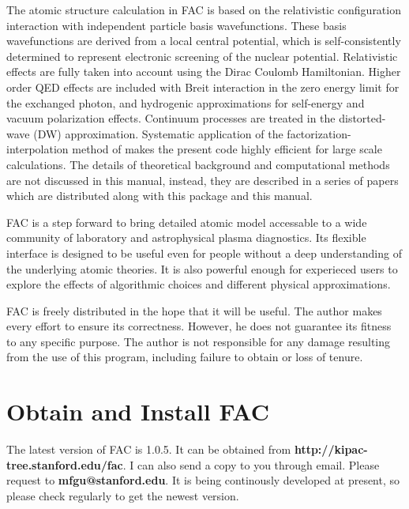 \documentclass[twoside,letterpaper]{refrep}
\newcommand{\facversion}{{1.0.5}\xspace}
\begin{document}
The atomic structure calculation in FAC is based on the relativistic
configuration interaction with independent particle basis wavefunctions. These
basis wavefunctions are derived from a local central potential, which is
self-consistently determined to represent electronic screening of the nuclear
potential. Relativistic effects are fully taken into account using the Dirac
Coulomb Hamiltonian. Higher order QED effects are included with Breit
interaction in the zero energy limit for the exchanged photon, and hydrogenic
approximations for self-energy and vacuum polarization effects. 
Continuum processes are treated
in the distorted-wave (DW) approximation. Systematic application of the
factorization-interpolation method of \citet{barshalom88} makes the present
code highly efficient for large scale calculations. The details of theoretical
background and computational methods are not discussed in this manual,
instead, they are described in a series of papers which are distributed along
with this package and this manual.

FAC is a step forward to bring detailed atomic model accessable to a wide
community of laboratory and astrophysical plasma diagnostics. Its flexible
interface is designed to be useful even for people without a deep
understanding of the underlying atomic theories. It is also powerful enough
for experieced users to explore the effects of algorithmic choices and
different physical approximations.

FAC is freely distributed in the hope that it will be useful. The author makes
every effort to ensure its correctness. However, he does not guarantee its
fitness to any specific purpose. The author is not responsible for any damage
resulting from the use of this program, including failure to obtain or loss of
tenure. 

\section{Obtain and Install FAC}
\label{sec:install}
The latest version of FAC is \facversion. It can be obtained from
\textbf{http://kipac-tree.stanford.edu/fac}. I can also send a copy to you
through email. Please request to \textbf{mfgu@stanford.edu}. It is being
continously developed at present, so please check regularly to get the newest
version.
\end{document}
